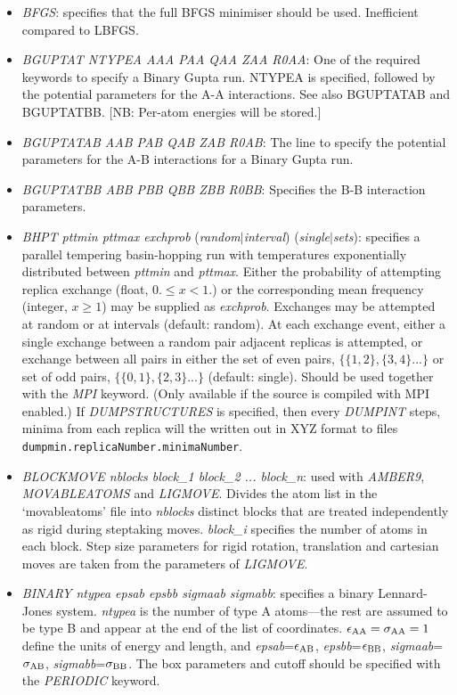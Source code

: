 \documentclass[12pt,a4paper,dvips]{article}
\begin{document}
\begin{itemize}
\item {\it BFGS}: specifies that the full BFGS minimiser should be used. Inefficient compared to LBFGS.

\item {\it BGUPTAT NTYPEA AAA PAA QAA ZAA R0AA}: One of the required keywords to specify a Binary Gupta run. 
NTYPEA is specified, followed by the potential parameters for the A-A interactions. See also BGUPTATAB and BGUPTATBB.
[NB: Per-atom energies will be stored.]

\item {\it BGUPTATAB AAB PAB QAB ZAB R0AB}: The line to specify the potential parameters for the A-B interactions 
for a Binary Gupta run.

\item {\it BGUPTATBB ABB PBB QBB ZBB R0BB}: Specifies the B-B interaction parameters.

\item {{\it BHPT pttmin pttmax exchprob\/} ({\it random\/}$|${\it interval\/}) ({\it single\/}$|${\it sets\/})\/}:
specifies a parallel tempering basin-hopping run with temperatures exponentially distributed between {\it pttmin\/} and
{\it pttmax\/}. Either the probability of attempting replica exchange (float, $0. \le x < 1.$) or the corresponding mean frequency
(integer, $x \ge 1$) may be supplied as {\it exchprob\/}. Exchanges may be attempted at random or at intervals (default: random).
At each exchange event, either a single exchange between a random pair adjacent replicas is attempted, or exchange between all
pairs in either the set of even pairs, $\{\{1,2\},\{3,4\}...\}$ or set of odd pairs, $\{\{0,1\},\{2,3\}...\}$ (default: single).
Should be used together with the {\it MPI\/} keyword.
(Only available if the source is compiled with MPI enabled.) If {\it DUMPSTRUCTURES\/} is specified, then every {\it DUMPINT\/} steps, minima from each replica will the written out in XYZ format to files {\tt dumpmin.replicaNumber.minimaNumber}.

\item {\it BLOCKMOVE nblocks block\_1 block\_2 ... block\_n}: used with {\it AMBER9\/}, {\it MOVABLEATOMS} and {\it LIGMOVE}. 
Divides the atom list in the \lq movableatoms' file into {\it nblocks} distinct blocks that are treated independently as 
rigid during steptaking moves. {\it block\_i} specifies the number of atoms in each block. Step size parameters for rigid 
rotation, translation and cartesian moves are taken from the parameters of {\it LIGMOVE}.

\item {\it BINARY ntypea epsab epsbb sigmaab sigmabb\/}: specifies a binary Lennard-Jones
system. {\it ntypea\/} is the number of type
A atoms---the rest are assumed to be type B and appear at the end of the list
of coordinates. $\epsilon_{\rm AA}=\sigma_{\rm AA}=1$ define the units of energy and length,
and {\it epsab\/}=$\epsilon_{\rm AB}$, {\it epsbb\/}=$\epsilon_{\rm BB}$,
{\it sigmaab\/}=$\sigma_{\rm AB}$, {\it sigmabb\/}=$\sigma_{\rm BB}$.
The box parameters and cutoff should be specified with the {\it PERIODIC\/} keyword.


\end{itemize}
\end{document}
